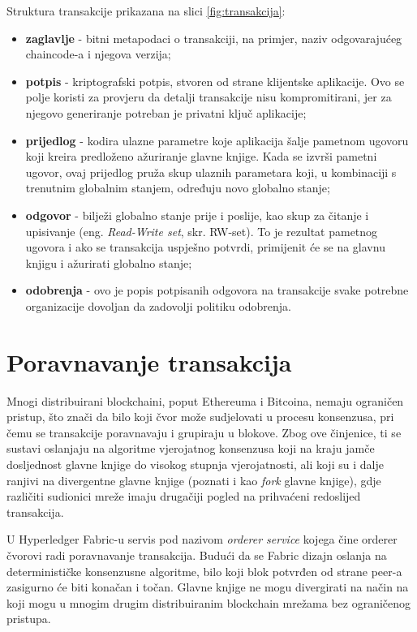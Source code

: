 \documentclass[times, utf8, diplomski]{fer}
\begin{document}
Struktura transakcije prikazana na slici \ref{fig:transakcija}:
\begin{itemize}
\item \textbf{zaglavlje} - bitni metapodaci o transakciji, na primjer, naziv odgovarajućeg chaincode-a i njegova verzija;
\item \textbf{potpis} - kriptografski potpis,  stvoren od strane klijentske aplikacije. Ovo se polje koristi za provjeru da detalji transakcije nisu kompromitirani, jer za njegovo generiranje potreban je privatni ključ aplikacije;
\item \textbf{prijedlog} - kodira ulazne parametre koje aplikacija šalje pametnom ugovoru koji kreira predloženo ažuriranje glavne knjige. Kada se izvrši pametni ugovor, ovaj prijedlog pruža skup ulaznih parametara koji, u kombinaciji s trenutnim globalnim stanjem, određuju novo globalno stanje;
\item \textbf{odgovor} - bilježi globalno stanje prije i poslije, kao skup za čitanje i upisivanje (eng. \textit{Read-Write set}, skr. RW-set). To je rezultat pametnog ugovora i ako se transakcija uspješno potvrdi, primijenit će se na glavnu knjigu i ažurirati globalno stanje;
\item \textbf{odobrenja} - ovo je popis potpisanih odgovora na transakcije svake potrebne organizacije dovoljan da zadovolji politiku odobrenja.
\end{itemize}
\section{Poravnavanje transakcija}
Mnogi distribuirani blockchaini, poput Ethereuma i Bitcoina, nemaju ograničen pristup, što znači da bilo koji čvor može sudjelovati u procesu konsenzusa, pri čemu se transakcije poravnavaju i grupiraju u blokove. Zbog ove činjenice, ti se sustavi oslanjaju na algoritme vjerojatnog konsenzusa koji na kraju jamče dosljednost glavne knjige do visokog stupnja vjerojatnosti, ali koji su i dalje ranjivi na divergentne glavne knjige (poznati i kao \textit{fork} glavne knjige), gdje različiti sudionici mreže imaju drugačiji pogled na prihvaćeni redoslijed transakcija. \cite{Fabric}

U Hyperledger Fabric-u servis pod nazivom \textit{orderer service} kojega čine orderer čvorovi radi poravnavanje transakcija.  Budući da se Fabric dizajn oslanja na determinističke konsenzusne algoritme, bilo koji blok potvrđen od strane peer-a zasigurno će biti konačan i točan.  Glavne knjige ne mogu divergirati na način na koji mogu u mnogim drugim distribuiranim blockchain mrežama bez ograničenog pristupa.
\end{document}
